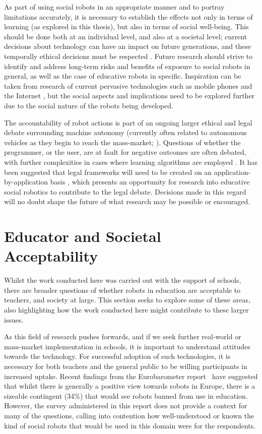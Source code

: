As part of using social robots in an appropriate manner and to portray limitations accurately, it is necessary to establish the effects not only in terms of \gls{learning} (as explored in this thesis), but also in terms of social well-being. This should be done both at an individual level, and also at a societal level; current decisions about technology can have an impact on future generations, and these temporally ethical decisions must be respected \citep{groves2006technological}. Future research should strive to identify and address long-term risks and benefits of exposure to social robots in general, as well as the case of educative robots in specific. Inspiration can be taken from research of current pervasive technologies such as mobile phones \citep{kamibeppu2005impact} and the Internet \citep{beranuy2009problematic}, but the social aspects and implications need to be explored further due to the social nature of the robots being developed.

The accountability of robot actions is part of an ongoing larger ethical and legal debate surrounding machine autonomy (currently often related to autonomous vehicles as they begin to reach the mass-market; \citealp{beiker2012legal}). Questions of whether the programmer, or the user, are at fault for negative outcomes are often debated, with further complexities in cases where learning algorithms are employed \citep{ros2011child}. It has been suggested that legal frameworks will need to be created on an application-by-application basis \citep{bertolini2013robots}, which presents an opportunity for research into educative social robotics to contribute to the legal debate. Decisions made in this regard will no doubt shape the future of what research may be possible or encouraged.

\section{Educator and Societal Acceptability} \label{sec:ch10-accept}
Whilst the work conducted here was carried out with the support of schools, there are broader questions of whether robots in education are acceptable to teachers, and society at large. This section seeks to explore some of these areas, also highlighting how the work conducted here might contribute to these larger issues.

As this field of research pushes forwards, and if we seek further real-world or mass-market implementation in schools, it is important to understand attitudes towards the technology. For successful adoption of such technologies, it is necessary for both teachers and the general public to be willing participants in increased uptake. Recent findings from the Eurobarometer report~\citep{eurobarometer2012robots} have suggested that whilst there is generally a positive view towards robots in Europe, there is a sizeable contingent (34\%) that would see robots banned from use in education. However, the survey administered in this report does not provide a context for many of the questions, calling into contention how well-understood or known the kind of social robots that would be used in this domain were for the respondents.

